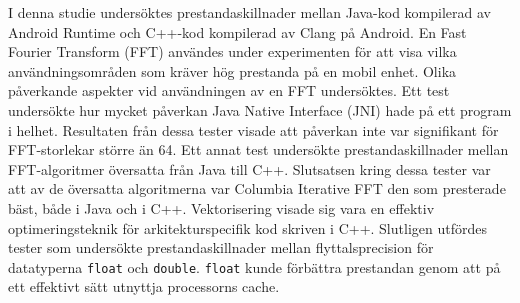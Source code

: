 I denna studie undersöktes prestandaskillnader mellan Java-kod kompilerad av Android Runtime och C++-kod kompilerad av Clang på Android. En Fast Fourier Transform (FFT) användes under experimenten för att visa vilka användningsområden som kräver hög prestanda på en mobil enhet. Olika påverkande aspekter vid användningen av en FFT undersöktes. Ett test undersökte hur mycket påverkan Java Native Interface (JNI) hade på ett program i helhet. Resultaten från dessa tester visade att påverkan inte var signifikant för FFT-storlekar större än 64. Ett annat test undersökte prestandaskillnader mellan FFT-algoritmer översatta från Java till C++. Slutsatsen kring dessa tester var att av de översatta algoritmerna var Columbia Iterative FFT den som presterade bäst, både i Java och i C++. Vektorisering visade sig vara en effektiv optimeringsteknik för arkitekturspecifik kod skriven i C++. Slutligen utfördes tester som undersökte prestandaskillnader mellan flyttalsprecision för datatyperna \texttt{float} och \texttt{double}. \texttt{float} kunde förbättra prestandan genom att på ett effektivt sätt utnyttja processorns cache.
